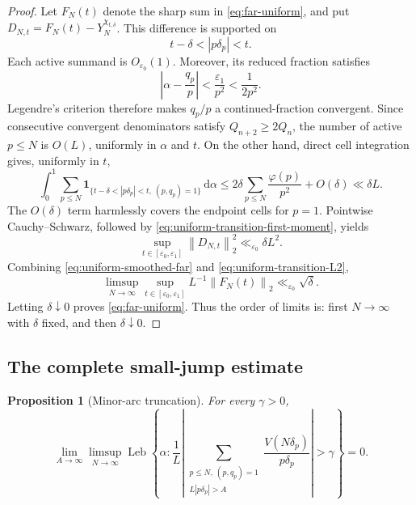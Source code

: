 \documentclass[11pt]{article}
\numberwithin{equation}{section}
\newtheorem{proposition}[theorem]{Proposition}
\theoremstyle{definition}
\newcommand{\1}{\mathbf 1}
\newcommand{\dd}{\,\mathrm d}
\newcommand{\Leb}{\operatorname{Leb}}
\newcommand{\norm}[1]{\left\lVert#1\right\rVert}
\begin{document}
\begin{proof}
Let \(F_N(t)\) denote the sharp sum in \eqref{eq:far-uniform}, and put
\(D_{N,t}=F_N(t)-Y_N^{\chi_{t,\delta}}\).  This difference is supported
on
\[
 t-\delta<|p\delta_p|<t.
\]
Each active summand is \(O_{\varepsilon_0}(1)\).  Moreover, its reduced
fraction satisfies
\[
 \left|\alpha-\frac{q_p}{p}\right|
 <\frac{\varepsilon_1}{p^2}<\frac1{2p^2}.
\]
Legendre's criterion therefore makes \(q_p/p\) a continued-fraction
convergent.  Since consecutive convergent denominators satisfy
\(Q_{n+2}\ge2Q_n\), the number of active \(p\le N\) is \(O(L)\),
uniformly in \(\alpha\) and \(t\).  On the other hand, direct cell
integration gives, uniformly in \(t\),
\begin{equation}\label{eq:uniform-transition-first-moment}
 \int_0^1\sum_{p\le N}
 \1_{\{t-\delta<|p\delta_p|<t,\ (p,q_p)=1\}}\dd\alpha
 \le2\delta\sum_{p\le N}\frac{\varphi(p)}{p^2}+O(\delta)
 \ll\delta L.
\end{equation}
The \(O(\delta)\) term harmlessly covers the endpoint cells for
\(p=1\).  Pointwise Cauchy--Schwarz, followed by
\eqref{eq:uniform-transition-first-moment}, yields
\begin{equation}\label{eq:uniform-transition-L2}
 \sup_{t\in[\varepsilon_0,\varepsilon_1]}
 \norm{D_{N,t}}_2^2\ll_{\varepsilon_0}\delta L^2.
\end{equation}
Combining \eqref{eq:uniform-smoothed-far} and
\eqref{eq:uniform-transition-L2},
\[
 \limsup_{N\to\infty}
 \sup_{t\in[\varepsilon_0,\varepsilon_1]}
 L^{-1}\norm{F_N(t)}_2
 \ll_{\varepsilon_0}\sqrt\delta.
\]
Letting \(\delta\downarrow0\) proves \eqref{eq:far-uniform}.  Thus the
order of limits is: first \(N\to\infty\) with \(\delta\) fixed, and
then \(\delta\downarrow0\).
\end{proof}

\subsection{The complete small-jump estimate}

\begin{proposition}[Minor-arc truncation]\label{prop:minor}
For every \(\gamma>0\),
\begin{equation}\label{eq:minor-final}
 \lim_{A\to\infty}\limsup_{N\to\infty}
 \Leb\left\{\alpha:
 \frac1L\left|
 \sum_{\substack{p\le N,\ (p,q_p)=1\\L|p\delta_p|>A}}
 \frac{V(N\delta_p)}{p\delta_p}\right|>\gamma\right\}=0.
\end{equation}
\end{proposition}
\end{document}
